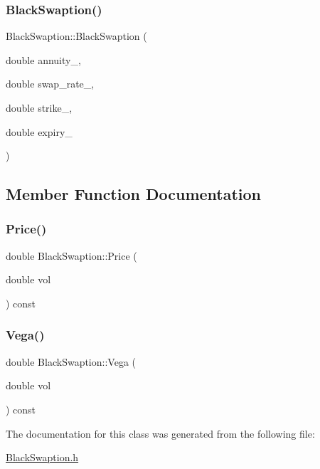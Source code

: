 \subsubsection{\texorpdfstring{Black\+Swaption()}{BlackSwaption()}}
{\footnotesize\ttfamily Black\+Swaption\+::\+Black\+Swaption (\begin{DoxyParamCaption}\item[{double}]{annuity\+\_\+,  }\item[{double}]{swap\+\_\+rate\+\_\+,  }\item[{double}]{strike\+\_\+,  }\item[{double}]{expiry\+\_\+ }\end{DoxyParamCaption})}



\subsection{Member Function Documentation}
\hypertarget{classBlackSwaption_a87dea283a7e04dc04179e4b7014dd2e5}{}\label{classBlackSwaption_a87dea283a7e04dc04179e4b7014dd2e5} 
\subsubsection{\texorpdfstring{Price()}{Price()}}
{\footnotesize\ttfamily double Black\+Swaption\+::\+Price (\begin{DoxyParamCaption}\item[{double}]{vol }\end{DoxyParamCaption}) const}

\hypertarget{classBlackSwaption_aa9f453250bb164887463ae41be3fca17}{}\label{classBlackSwaption_aa9f453250bb164887463ae41be3fca17} 
\subsubsection{\texorpdfstring{Vega()}{Vega()}}
{\footnotesize\ttfamily double Black\+Swaption\+::\+Vega (\begin{DoxyParamCaption}\item[{double}]{vol }\end{DoxyParamCaption}) const}



The documentation for this class was generated from the following file\+:\begin{DoxyCompactItemize}
\item 
\hyperlink{BlackSwaption_8h}{Black\+Swaption.\+h}\end{DoxyCompactItemize}
